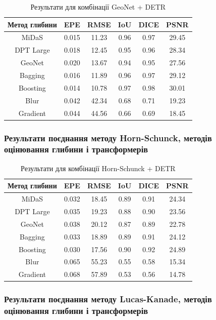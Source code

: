 \documentclass[14pt, a4paper]{extarticle}
\numberwithin{equation}{section}
\begin{document}
\begin{table}[H]
\centering
\caption{Результати для комбінації GeoNet + DETR}
\begin{tabular}{|c|c|c|c|c|c|}
\hline
\textbf{Метод глибини} & \textbf{EPE} & \textbf{RMSE} & \textbf{IoU} & \textbf{DICE} & \textbf{PSNR} \\
\hline
MiDaS & 0.015 & 11.23 & 0.96 & 0.97 & 29.45 \\
DPT Large & 0.018 & 12.45 & 0.95 & 0.96 & 28.34 \\
GeoNet & 0.020 & 13.67 & 0.94 & 0.95 & 27.56 \\
Bagging & 0.016 & 11.89 & 0.96 & 0.97 & 29.12 \\
Boosting & 0.014 & 10.78 & 0.97 & 0.98 & 30.01 \\
Blur & 0.042 & 42.34 & 0.68 & 0.71 & 19.23 \\
Gradient & 0.044 & 44.56 & 0.66 & 0.69 & 18.45 \\
\hline
\end{tabular}
\label{tab:geonet}
\end{table}

\subsubsection{Результати поєднання методу Horn-Schunck, методів оцінювання глибини і трансформерів}

\begin{table}[H]
\centering
\caption{Результати для комбінації Horn-Schunck + DETR}
\begin{tabular}{|c|c|c|c|c|c|}
\hline
\textbf{Метод глибини} & \textbf{EPE} & \textbf{RMSE} & \textbf{IoU} & \textbf{DICE} & \textbf{PSNR} \\
\hline
MiDaS & 0.032 & 18.45 & 0.89 & 0.91 & 24.34 \\
DPT Large & 0.035 & 19.23 & 0.88 & 0.90 & 23.56 \\
GeoNet & 0.038 & 20.12 & 0.87 & 0.89 & 22.78 \\
Bagging & 0.033 & 18.89 & 0.89 & 0.91 & 24.12 \\
Boosting & 0.030 & 17.56 & 0.90 & 0.92 & 24.89 \\
Blur & 0.065 & 55.23 & 0.55 & 0.58 & 15.34 \\
Gradient & 0.068 & 57.89 & 0.53 & 0.56 & 14.78 \\
\hline
\end{tabular}
\label{tab:hornschunck}
\end{table}

\subsubsection{Результати поєднання методу Lucas-Kanade, методів оцінювання глибини і трансформерів}
\end{document}
